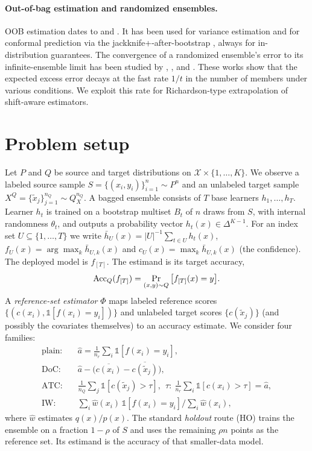 \paragraph{Out-of-bag estimation and randomized ensembles.}
OOB estimation dates to \citet{breiman1996oob} and \citet{breiman2001rf}. It has been used for variance estimation \citep{wager2014ij} and for conformal prediction via the jackknife+-after-bootstrap \citep{kim2020jab}, always for in-distribution guarantees. The convergence of a randomized ensemble's error to its infinite-ensemble limit has been studied by \citet{ng2001voting}, \citet{lopes2016sharp}, \citet{cannings2017rp} and \citet{lopes2019aos}. These works show that the expected excess error decays at the fast rate $1/t$ in the number of members under various conditions. We exploit this rate for Richardson-type extrapolation \citep{richardson1911} of shift-aware estimators.

\section{Problem setup}
\label{sec:setup}

Let $P$ and $Q$ be source and target distributions on $\mathcal X\times\{1,\dots,K\}$. We observe a labeled source sample $S=\{(x_i,y_i)\}_{i=1}^n\sim P^n$ and an unlabeled target sample $X^Q=\{\tilde x_j\}_{j=1}^{n_Q}\sim Q_X^{n_Q}$. A bagged ensemble consists of $T$ base learners $h_1,\dots,h_T$. Learner $h_t$ is trained on a bootstrap multiset $B_t$ of $n$ draws from $S$, with internal randomness $\theta_t$, and outputs a probability vector $h_t(x)\in\Delta^{K-1}$. For an index set $U\subseteq\{1,\dots,T\}$ we write $\bar h_U(x)=|U|^{-1}\sum_{t\in U}h_t(x)$, $f_U(x)=\arg\max_k \bar h_{U,k}(x)$ and $c_U(x)=\max_k\bar h_{U,k}(x)$ (the confidence). The deployed model is $f_{[T]}$. The estimand is its target accuracy,
\begin{equation}
\mathrm{Acc}_Q(f_{[T]})=\Pr_{(x,y)\sim Q}\big[f_{[T]}(x)=y\big].
\end{equation}
A \emph{reference-set estimator} $\Phi$ maps labeled reference scores $\{(c(x_i),\mathbb 1[f(x_i)=y_i])\}$ and unlabeled target scores $\{c(\tilde x_j)\}$ (and possibly the covariates themselves) to an accuracy estimate. We consider four families:
\begin{align*}
\text{plain:}\quad &\hat a=\textstyle\frac1{n_r}\sum_i \mathbb 1[f(x_i)=y_i],\\
\text{DoC:}\quad &\hat a-\big(\overline{c(x_i)}-\overline{c(\tilde x_j)}\big),\\
\text{ATC:}\quad &\textstyle\frac1{n_Q}\sum_j \mathbb 1[c(\tilde x_j)>\tau],\ \ \tau:\ \tfrac1{n_r}\textstyle\sum_i \mathbb 1[c(x_i)>\tau]=\hat a,\\
\text{IW:}\quad &\textstyle\sum_i \hat w(x_i)\,\mathbb 1[f(x_i)=y_i]\big/\sum_i\hat w(x_i),
\end{align*}
where $\hat w$ estimates $q(x)/p(x)$. The standard \emph{holdout} route (HO) trains the ensemble on a fraction $1-\rho$ of $S$ and uses the remaining $\rho n$ points as the reference set. Its estimand is the accuracy of that smaller-data model.

